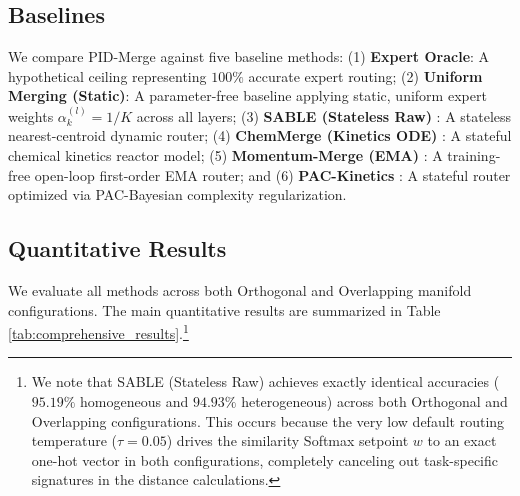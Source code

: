 \subsection{Baselines}
We compare PID-Merge against five baseline methods: (1) \textbf{Expert Oracle}: A hypothetical ceiling representing $100\%$ accurate expert routing; (2) \textbf{Uniform Merging (Static)}: A parameter-free baseline applying static, uniform expert weights $\alpha_k^{(l)} = 1/K$ across all layers; (3) \textbf{SABLE (Stateless Raw)} \cite{sable}: A stateless nearest-centroid dynamic router; (4) \textbf{ChemMerge (Kinetics ODE)} \cite{chemmerge}: A stateful chemical kinetics reactor model; (5) \textbf{Momentum-Merge (EMA)} \cite{momentum_merge}: A training-free open-loop first-order EMA router; and (6) \textbf{PAC-Kinetics} \cite{pac_kinetics}: A stateful router optimized via PAC-Bayesian complexity regularization.

\subsection{Quantitative Results}

We evaluate all methods across both Orthogonal and Overlapping manifold configurations. The main quantitative results are summarized in Table \ref{tab:comprehensive_results}.\footnote{We note that SABLE (Stateless Raw) achieves exactly identical accuracies ($95.19\%$ homogeneous and $94.93\%$ heterogeneous) across both Orthogonal and Overlapping configurations. This occurs because the very low default routing temperature ($\tau = 0.05$) drives the similarity Softmax setpoint $w$ to an exact one-hot vector in both configurations, completely canceling out task-specific signatures in the distance calculations.}

